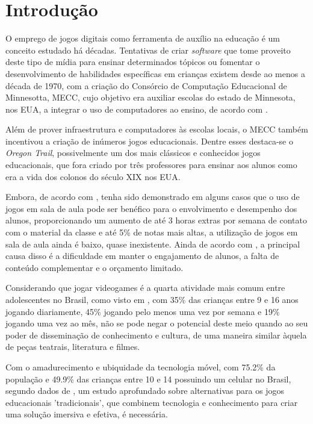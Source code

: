 \chapter{Introdução}

O emprego de jogos digitais como ferramenta de auxílio na educação é um conceito estudado há décadas. Tentativas de criar \textit{software} que tome proveito deste tipo de mídia para ensinar determinados tópicos ou fomentar o desenvolvimento de habilidades específicas em crianças existem desde ao menos a década de 1970, com a criação do Consórcio de Computação Educacional de Minnesotta, MECC, cujo objetivo era auxiliar escolas do estado de Minnesota, nos EUA, a integrar o uso de computadores ao ensino, de acordo com \cite{lussenhop:2016:oregon-trail}.

Além de prover infraestrutura e computadores às escolas locais, o MECC também incentivou a criação de inúmeros jogos educacionais. Dentre esses destaca-se o \textit{Oregon Trail}, possivelmente um dos mais clássicos e conhecidos jogos educacionais, que fora criado por três professores para ensinar aos alunos como era a vida dos colonos do século XIX nos EUA. 

Embora, de acordo com \cite{poli:2012:video-game-spore}, tenha sido demonstrado em alguns casos que o uso de jogos em sala de aula pode ser benéfico	 para o envolvimento e desempenho dos alunos, proporcionando um aumento de até 3 horas extras por semana de contato com o material da classe e até 5\% de notas mais altas, a utilização de jogos em sala de aula ainda é baixo, quase inexistente. Ainda de acordo com \cite{poli:2012:video-game-spore}, a principal causa disso é a dificuldade em manter o engajamento de alunos, a falta de conteúdo complementar e o orçamento limitado.

Considerando que jogar videogames é a quarta atividade mais comum entre adolescentes no Brasil, como visto em \cite{bndes:2014:mapeamento}, com 35\% das crianças entre 9 e 16 anos jogando diariamente, 45\% jogando pelo menos uma vez por semana e 19\% jogando uma vez ao mês, não se pode negar o potencial deste meio quando ao seu poder de disseminação de conhecimento e cultura, de uma maneira similar àquela de peças teatrais, literatura e filmes.

Com o amadurecimento e ubiquidade da tecnologia móvel, com 75.2\% da população e 49.9\% das crianças entre 10 e 14 possuindo um celular no Brasil, segundo dados de \cite{IBGE:2015:PNAD_TIC_2013}, um estudo aprofundado sobre alternativas para os jogos educacionais 'tradicionais', que combinem tecnologia e conhecimento para criar uma solução imersiva e efetiva, é necessária.

